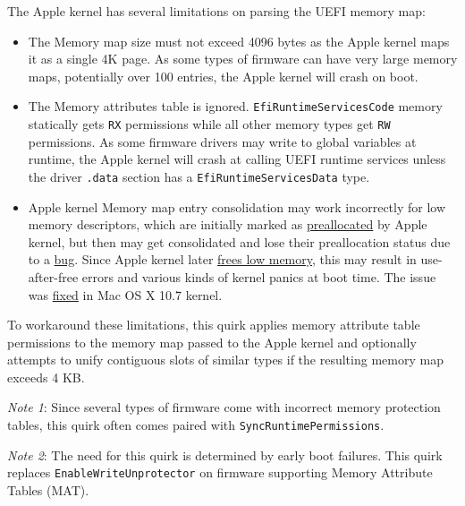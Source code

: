 \documentclass[]{article}
\providecommand{\tightlist}{%
  \setlength{\itemsep}{0pt}\setlength{\parskip}{0pt}}
\begin{document}
\begin{enumerate}
  The Apple kernel has several limitations on parsing the UEFI memory map:

  \begin{itemize}
  \tightlist
  \item The Memory map size must not exceed 4096 bytes as the Apple kernel maps
    it as a single 4K page. As some types of firmware can have very large memory maps,
    potentially over 100 entries, the Apple kernel will crash on boot.
  \item The Memory attributes table is ignored. \texttt{EfiRuntimeServicesCode}
    memory statically gets \texttt{RX} permissions while all other memory types
    get \texttt{RW} permissions. As some firmware drivers may write to global
    variables at runtime, the Apple kernel will crash at calling UEFI runtime services
    unless the driver \texttt{.data} section has a \texttt{EfiRuntimeServicesData}
    type.
  \item Apple kernel Memory map entry consolidation may work incorrectly for low memory descriptors,
    which are initially marked as
    \href{https://github.com/apple-oss-distributions/xnu/blob/rel/xnu-792/osfmk/i386/i386_vm_init.c#L282}{preallocated}
    by Apple kernel, but then may get consolidated and lose their preallocation status due to a
    \href{https://github.com/apple-oss-distributions/xnu/blob/rel/xnu-792/osfmk/i386/i386_vm_init.c#L339}{bug}.
    Since Apple kernel later
    \href{https://github.com/apple-oss-distributions/xnu/blob/rel/xnu-792/osfmk/i386/pmap.c#L1204}{frees low memory},
    this may result in use-after-free errors and various kinds of kernel panics at boot time.
    The issue was \href{https://github.com/apple-oss-distributions/xnu/blob/rel/xnu-1699/osfmk/i386/i386_vm_init.c#L450}{fixed}
    in Mac OS X 10.7 kernel. 
  \end{itemize}

  To workaround these limitations, this quirk applies memory attribute table
  permissions to the memory map passed to the Apple kernel and optionally attempts
  to unify contiguous slots of similar types if the resulting memory map exceeds
  4 KB.

  \emph{Note 1}: Since several types of firmware come with incorrect memory protection
  tables, this quirk often comes paired with \texttt{SyncRuntimePermissions}.

  \emph{Note 2}: The need for this quirk is determined by early boot failures.
  This quirk replaces \texttt{EnableWriteUnprotector} on firmware supporting
  Memory Attribute Tables (MAT).


\end{enumerate}
\end{document}
